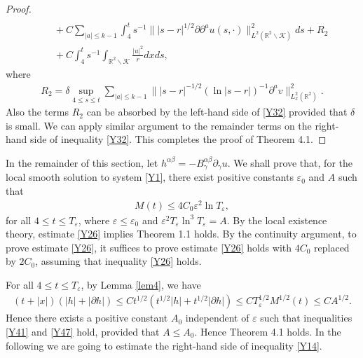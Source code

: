 \documentclass[11pt, reqno]{amsart}
\theoremstyle{definition}
\theoremstyle{remark}
\theoremstyle{definition}
\numberwithin{equation}{section}
\numberwithin{equation}{section}
\def\leq{\leqslant}
\begin{document}
\begin{proof}
\begin{align}
\nonumber\\&\quad+C\sum_{|a|\leq k-1}\int_4^ts^{-1}\||s-r|^{1/2}\partial\partial^au(s,\cdot)\|_{L^2(\mathbb R^2\backslash\mathcal {K})}^2ds+R_2
\nonumber\\&\quad+C\int_4^ts^{-1}\int_{\mathbb R^2\backslash\mathcal{K}}\frac{|u|^2}rdxds,
\end{align}
where
\begin{align*}
R_2=\delta\sup_{4\leq s\leq t}\sum_{|a|\leq k-1}\||s-r|^{-1/2}(\ln|s-r|)^{-1}\partial^av\|_{L_x^2(\mathbb R^2)}^2.
\end{align*}
Also the terms $R_2$ can be absorbed by the left-hand side of \eqref{Y32} provided that $\delta$ is small. We can apply similar argument to the remainder terms 
on the right-hand side of inequality \eqref{Y32}. This completes the proof of Theorem 4.1.
\end{proof}
\par In the remainder of this section, let
$h^{\alpha\beta}=-B_{\gamma}^{\alpha\beta}\partial_{\gamma}u$. We
shall prove that, for the local smooth solution to system
\eqref{Y1}, there exist positive constants $\varepsilon_0$ and $A$
such that
\begin{align}\label{Y26}
M(t)\leq 4C_0\varepsilon^2\ln T_{\varepsilon},
\end{align}
for all $4\leq t\leq T_{\varepsilon}$, where $\varepsilon\leq
\varepsilon_0$ and $\varepsilon^2
T_{\varepsilon}\ln^3T_{\varepsilon}=A$. By the local existence
theory, estimate \eqref{Y26} implies Theorem 1.1 holds. By the
continuity argument, to prove estimate \eqref{Y26}, it suffices to
prove estimate \eqref{Y26} holds with $4C_0$ replaced by $2C_0$,
assuming that inequality \eqref{Y26} holds.
\par For all $4\leq t\leq T_{\varepsilon}$, by Lemma \ref{lem4}, we have
\begin{align*}
(t+|x|)(|h|+|\partial h|)\leq Ct^{1/2}(t^{1/2}|h|+t^{1/2}|\partial
h|)\leq CT^{1/2}_{\varepsilon}M^{1/2}(t)\leq CA^{1/2}.
\end{align*}
Hence there exists a positive constant $A_0$ independent of
$\varepsilon$ such that inequalities \eqref{Y41} and \eqref{Y47}
hold, provided that $A\leq A_0$. Hence Theorem 4.1 holds. In the following we are going to
estimate the right-hand side of inequality \eqref{Y14}.
\end{document}
